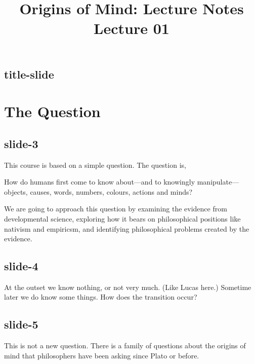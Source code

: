 \documentclass[12pt,\papersize]{extarticle}
\begin{document}
\setlength\footnotesep{1em}






\title {Origins of Mind: Lecture Notes \\ Lecture 01}
 
 
 
\maketitle
 
 
 
\subsection{title-slide}
 
 
\section{The Question}
 
 
 
\subsection{slide-3}
This course is based on a simple question. The question is,
 
How do humans first come to know about---and to knowingly manipulate---objects, causes, words, numbers, colours, actions and minds?
 
We are going to approach this question by examining the evidence from developmental science, exploring how it bears on philosophical positions like nativism and empiricsm, and identifying philosophical problems created by the evidence.
 
 
 
\subsection{slide-4}
At the outset we know nothing, or not very much. (Like Lucas here.) Sometime later we do know some things. How does the transition occur?

 
 
 
\subsection{slide-5}
This is not a new question. There is a family of questions about the origins of mind that philosophers have been asking since Plato or before.
 
\end{document}
